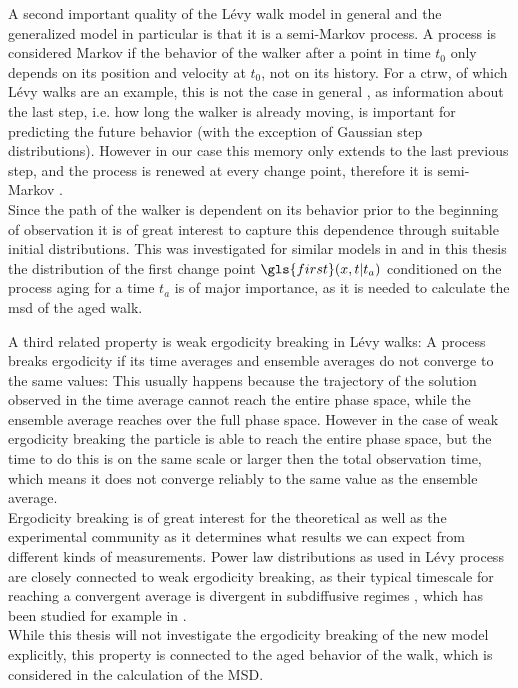 A second important quality of the L\'evy walk model in general and the generalized model in particular is that it is a semi-Markov process. A process is considered Markov if the behavior of the walker after a point in time $t_0$ only depends on its position and velocity at $t_0$, not on its history. For a \gls{ctrw}, of which L\'evy walks are an example, this is not the case in general \cite{firstSteps}, as information about the last step, i.e. how long the walker is already moving, is important for predicting the future behavior (with the exception of Gaussian step distributions). However in our case this memory only extends to the last previous step, and the process is renewed at every change point, therefore it is semi-Markov \cite{lwreview}.
 \\
Since the path of the walker is dependent on its behavior prior to the beginning of observation it is of great interest to capture this dependence through suitable initial distributions. This was investigated for similar models in \cite{barkai2003a, barkai2003b} and in this thesis the distribution of the first change point $\gls{first}(x,t|t_a)$ conditioned on the process aging for a time $t_a$ is of major importance, as it is needed to calculate the \gls{msd} of the aged walk.

A third related property is weak ergodicity breaking in L\'evy walks: A process breaks ergodicity if its time averages and ensemble averages do not converge to the same values: This usually happens because the trajectory of the solution observed in the time average cannot reach the entire phase space, while the ensemble average reaches over the full phase space. 
{\color{blue}
However in the case of weak ergodicity breaking the particle is able to reach the entire phase space, but the time to do this is on the same scale or larger then the total observation time, which means it does not converge reliably to the same value as the ensemble average. 
}\\
Ergodicity breaking is of great interest for the theoretical as well as the experimental community as it determines what results we can expect from different kinds of measurements. Power law distributions as used in L\'evy process are closely connected to weak ergodicity breaking, as their typical timescale for reaching a convergent average is divergent in subdiffusive regimes \cite{anomalousTransport}, which has been studied for example in \cite{brokmann2003,radons2018}.\\
While this thesis will not investigate the ergodicity breaking of the new model explicitly, this property is connected to the aged behavior of the walk, which is considered in the calculation of the MSD. 

